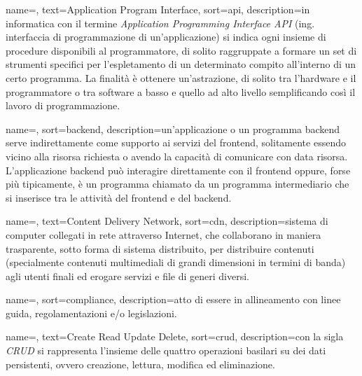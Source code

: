 
{
    name=,
    text=Application Program Interface,
    sort=api,
    description={in informatica con il termine \emph{Application Programming Interface API} (ing. interfaccia di programmazione di un'applicazione) si indica ogni insieme di procedure disponibili al programmatore, di solito raggruppate a formare un set di strumenti specifici per l'espletamento di un determinato compito all'interno di un certo programma. La finalità è ottenere un'astrazione, di solito tra l'hardware e il programmatore o tra software a basso e quello ad alto livello semplificando così il lavoro di programmazione.}
}

{
	name=,
	sort=backend,
	description={un'applicazione o un programma backend serve indirettamente come supporto ai servizi del frontend, solitamente essendo vicino alla risorsa richiesta o avendo la capacità di comunicare con data risorsa. L'applicazione backend può interagire direttamente con il frontend oppure, forse più tipicamente, è un programma chiamato da un programma intermediario che si inserisce tra le attività del frontend e del backend.}
}

{
	name=,
	text=Content Delivery Network,
	sort=cdn,
	description={sistema di computer collegati in rete attraverso Internet, che collaborano in maniera trasparente, sotto forma di sistema distribuito, per distribuire contenuti (specialmente contenuti multimediali di grandi dimensioni in termini di banda) agli utenti finali ed erogare servizi e file di generi diversi.}
}

{
	name=,
	sort=compliance,
	description={atto di essere in allineamento con linee guida, regolamentazioni e/o legislazioni.}
}

{
	name=,
	text=Create Read Update Delete,
	sort=crud,
	description={con la sigla \emph{CRUD} si rappresenta l'insieme delle quattro operazioni basilari su dei dati persistenti, ovvero creazione, lettura, modifica ed eliminazione.}
}

